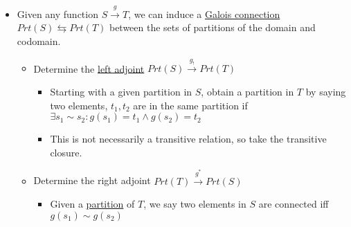 \begin{itemize}
    \item Given any function $S \xrightarrow{g} T$, we can induce a \href{doc/1 math/Seven Sketches in Compositionality/Chapter 1: Generative Effects/6 Galois connections/1 Definition and examples/Galois connection}{Galois connection} $Prt(S) \leftrightarrows Prt(T)$ between the sets of partitions of the domain and codomain.
          \begin{itemize}
            \item Determine the \href{doc/1 math/Seven Sketches in Compositionality/Chapter 1: Generative Effects/6 Galois connections/1 Definition and examples/Galois connection}{left adjoint} $Prt(S) \xrightarrow{g_!} Prt(T)$
                  \begin{itemize}
                    \item Starting with a given partition in $S$, obtain a partition in $T$ by saying two elements, $t_1,t_2$ are in the same partition if $\exists s_1 \sim s_2: g(s_1)=t_1 \land g(s_2)=t_2$
                    \item This is not necessarily a transitive relation, so take the transitive closure.
                  \end{itemize}
            \item Determine the right adjoint $Prt(T) \xrightarrow{g^*} Prt(S)$
                  \begin{itemize}
                    \item Given a \href{doc/1 math/Seven Sketches in Compositionality/Chapter 1: Generative Effects/2 What is order/Partition}{partition} of $T$, we say two elements in $S$ are connected iff $g(s_1) \sim g(s_2)$
                  \end{itemize}
          \end{itemize}
  \end{itemize}